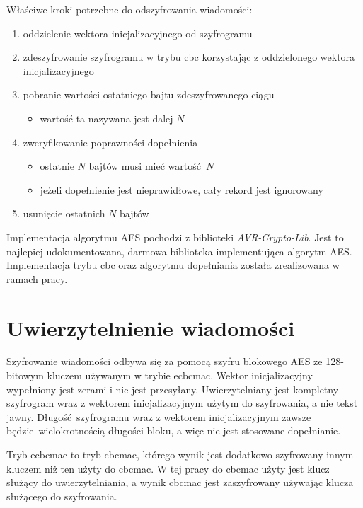 Właściwe kroki potrzebne do odszyfrowania wiadomości:

\begin{enumerate}
\item oddzielenie wektora inicjalizacyjnego od szyfrogramu
\item zdeszyfrowanie szyfrogramu w trybu \gls{cbc} korzystając z oddzielonego wektora inicjalizacyjnego
\item pobranie wartości ostatniego bajtu zdeszyfrowanego ciągu
\begin{itemize}
    \item wartość ta nazywana jest dalej $ N $
\end{itemize}
\item zweryfikowanie poprawności dopełnienia
\begin{itemize}
\item ostatnie $ N $ bajtów musi mieć wartość $ N $
\item jeżeli dopełnienie jest nieprawidłowe, cały rekord jest ignorowany
\end{itemize}
\item usunięcie ostatnich $ N $ bajtów
\end{enumerate}

Implementacja algorytmu AES pochodzi z biblioteki \emph{AVR-Crypto-Lib}. Jest to najlepiej udokumentowana, darmowa biblioteka implementująca algorytm AES. Implementacja trybu \gls{cbc} oraz algorytmu dopełniania została zrealizowana w ramach pracy.

\section{Uwierzytelnienie wiadomości}
\label{sec:auth}

Szyfrowanie wiadomości odbywa się za pomocą szyfru blokowego AES ze 128-bitowym kluczem używanym w trybie \gls{ecbcmac}. Wektor inicjalizacyjny wypełniony jest zerami i nie jest przesyłany. Uwierzytelniany jest kompletny szyfrogram wraz z wektorem inicjalizacyjnym użytym do szyfrowania, a nie tekst jawny. Długość szyfrogramu wraz z wektorem inicjalizacyjnym zawsze będzie wielokrotnością długości bloku, a więc nie jest stosowane dopełnianie.

Tryb \gls{ecbcmac} to tryb \gls{cbcmac}, którego wynik jest dodatkowo szyfrowany innym kluczem niż ten użyty do \gls{cbcmac}. W tej pracy do \gls{cbcmac} użyty jest klucz służący do uwierzytelniania, a wynik \gls{cbcmac} jest zaszyfrowany używając klucza służącego do szyfrowania.

